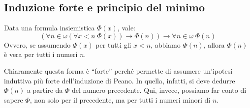 \documentclass[11pt]{scrartcl}
\begin{document}
\subsection{Induzione forte e principio del minimo}
\begin{theorem}
	Data una formula insiemistica $\Phi(x)$, vale:
	\[ (\forall n \in \omega (\forall x < n \; \Phi (x)) \rightarrow \Phi(n)) \rightarrow \forall n \in \omega \; \Phi(n)
		\]
	Ovvero, se assumendo $\Phi(x)$ per tutti gli $x < n$, abbiamo $\Phi(n)$, allora $\Phi(n)$ è vera per tutti i numeri $n$.
\end{theorem}

\begin{remark}
	Chiaramente questa forma è ``forte'' perché permette di assumere un'ipotesi induttiva più forte dell'induzione di Peano. In quella, infatti, si deve dedurre $\Phi(n)$ a 
	partire da $\Phi$ del numero precedente. Qui, invece, possiamo far conto di sapere $\Phi$, non solo per il precedente, ma per tutti i numeri minori di $n$.
\end{remark}
\end{document}

